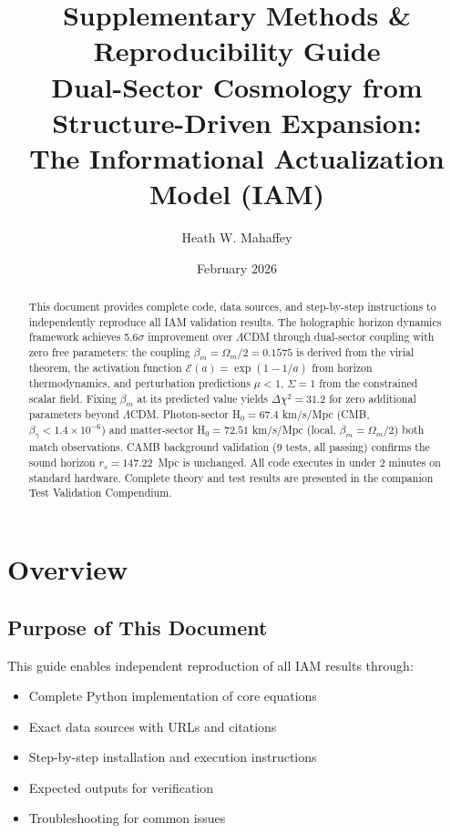 \documentclass[11pt]{article}
\title{\textbf{Supplementary Methods \& Reproducibility Guide} \\ 
\large Dual-Sector Cosmology from Structure-Driven Expansion: \\
The Informational Actualization Model (IAM)}
\author{Heath W. Mahaffey}
\date{February 2026}
\begin{document}
\maketitle

\begin{abstract}
This document provides complete code, data sources, and step-by-step instructions to independently reproduce all IAM validation results. The holographic horizon dynamics framework achieves 5.6$\sigma$ improvement over $\Lambda$CDM through dual-sector coupling with zero free parameters: the coupling $\beta_m = \Omega_m/2 = 0.1575$ is derived from the virial theorem, the activation function $\mathcal{E}(a) = \exp(1-1/a)$ from horizon thermodynamics, and perturbation predictions $\mu < 1$, $\Sigma = 1$ from the constrained scalar field. Fixing $\beta_m$ at its predicted value yields $\Delta\chi^2 = 31.2$ for zero additional parameters beyond $\Lambda$CDM. Photon-sector H$_0 = 67.4$ km/s/Mpc (CMB, $\beta_\gamma < 1.4 \times 10^{-6}$) and matter-sector H$_0 = 72.51$ km/s/Mpc (local, $\beta_m = \Omega_m/2$) both match observations. CAMB background validation (9 tests, all passing) confirms the sound horizon $r_s = 147.22$~Mpc is unchanged. All code executes in under 2 minutes on standard hardware. Complete theory and test results are presented in the companion Test Validation Compendium.
\end{abstract}

\tableofcontents
\newpage

\section{Overview}

\subsection{Purpose of This Document}

This guide enables independent reproduction of all IAM results through:
\begin{itemize}
    \item Complete Python implementation of core equations
    \item Exact data sources with URLs and citations
    \item Step-by-step installation and execution instructions
    \item Expected outputs for verification
    \item Troubleshooting for common issues
\end{itemize}
\end{document}
